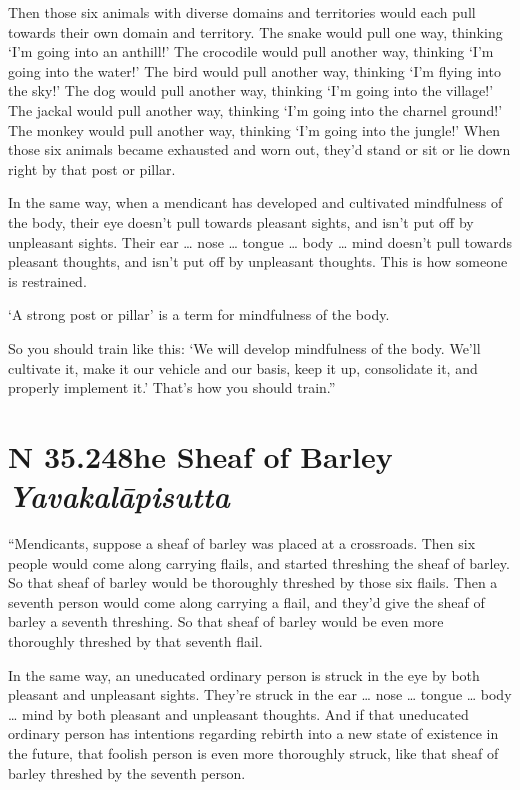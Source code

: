 \documentclass[12pt,openany]{book}%
\newcommand*{\suttatitleacronym}[1]{\smaller[2]{#1}\vspace*{.3em}}
\newcommand*{\suttatitletranslation}[1]{\linebreak{#1}}
\newcommand*{\suttatitleroot}[1]{\linebreak\smaller[2]\itshape{#1}}
\newcommand*{\tocacronym}[1]{\hspace*{-3.3em}{#1}\quad}
\newcommand*{\toctranslation}[1]{#1}
\newcommand*{\tocroot}[1]{(\textit{#1})}
\begin{document}
Then those six animals with diverse domains and territories would each pull towards their own domain and territory. The snake would pull one way, thinking ‘I’m going into an anthill!’ The crocodile would pull another way, thinking ‘I’m going into the water!’ The bird would pull another way, thinking ‘I’m flying into the sky!’ The dog would pull another way, thinking ‘I’m going into the village!’ The jackal would pull another way, thinking ‘I’m going into the charnel ground!’ The monkey would pull another way, thinking ‘I’m going into the jungle!’ When those six animals became exhausted and worn out, they’d stand or sit or lie down right by that post or pillar. 

In the same way, when a mendicant has developed and cultivated mindfulness of the body, their eye doesn’t pull towards pleasant sights, and isn’t put off by unpleasant sights. Their ear … nose … tongue … body … mind doesn’t pull towards pleasant thoughts, and isn’t put off by unpleasant thoughts. This is how someone is restrained. 

‘A strong post or pillar’ is a term for mindfulness of the body. 

So you should train like this: ‘We will develop mindfulness of the body. We’ll cultivate it, make it our vehicle and our basis, keep it up, consolidate it, and properly implement it.’ That’s how you should train.” 

%
\section*{{\suttatitleacronym SN 35.248}{\suttatitletranslation The Sheaf of Barley }{\suttatitleroot Yavakalāpisutta}}
\addcontentsline{toc}{section}{\tocacronym{SN 35.248} \toctranslation{The Sheaf of Barley } \tocroot{Yavakalāpisutta}}

“Mendicants, suppose a sheaf of barley was placed at a crossroads. Then six people would come along carrying flails, and started threshing the sheaf of barley. So that sheaf of barley would be thoroughly threshed by those six flails. Then a seventh person would come along carrying a flail, and they’d give the sheaf of barley a seventh threshing. So that sheaf of barley would be even more thoroughly threshed by that seventh flail. 

In the same way, an uneducated ordinary person is struck in the eye by both pleasant and unpleasant sights. They’re struck in the ear … nose … tongue … body … mind by both pleasant and unpleasant thoughts. And if that uneducated ordinary person has intentions regarding rebirth into a new state of existence in the future, that foolish person is even more thoroughly struck, like that sheaf of barley threshed by the seventh person. 
\end{document}
